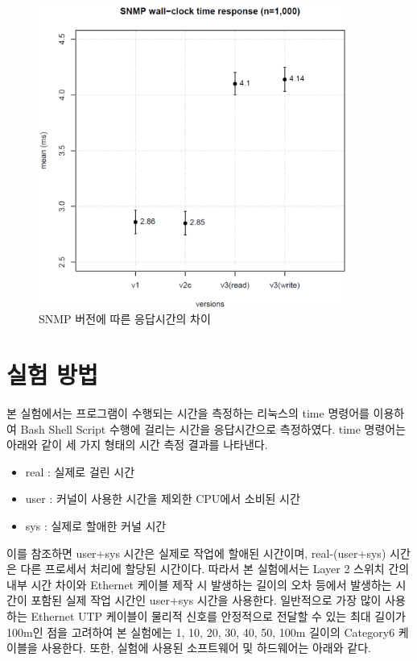 \documentclass[11pt
  , a4paper
  , article
  , oneside
]{memoir}
\begin{document}
\begin{figure}[!h]
  \centering
  \includegraphics[width=0.9\textwidth]{./images/pretest.eps}
  \caption{SNMP 버전에 따른 응답시간의 차이}
  \label{fig:prestest}   
\end{figure}


\section{실험 방법}
본 실험에서는 프로그램이 수행되는 시간을 측정하는 리눅스의 time 명령어\citep{time_command}를 이용하여 Bash Shell Script 수행에 걸리는 시간을 응답시간으로 측정하였다. time 명령어는 아래와 같이 세 가지 형태의 시간 측정 결과를 나타낸다. 
\begin{itemize}
\item real : 실제로 걸린 시간
\item user : 커널이 사용한 시간을 제외한 CPU에서 소비된 시간
\item sys : 실제로 할애한 커널 시간
\end{itemize}
이를 참조하면 user+sys 시간은 실제로 작업에 할애된 시간이며, real-(user+sys) 시간은 다른 프로세서 처리에 할당된 시간이다. 따라서 본 실험에서는 Layer 2 스위치 간의 내부 시간 차이와 Ethernet 케이블 제작 시 발생하는 길이의 오차 등에서 발생하는 시간이 포함된 실제 작업 시간인 user+sys 시간을 사용한다. 일반적으로 가장 많이 사용하는 Ethernet UTP 케이블이 물리적 신호를 안정적으로 전달할 수 있는 최대 길이가 100m인 점을 고려하여 본 실험에는 1, 10, 20, 30, 40, 50, 100m 길이의 Category6 케이블을 사용한다. 또한, 실험에 사용된 소프트웨어 및 하드웨어는 아래와 같다.
\end{document}
